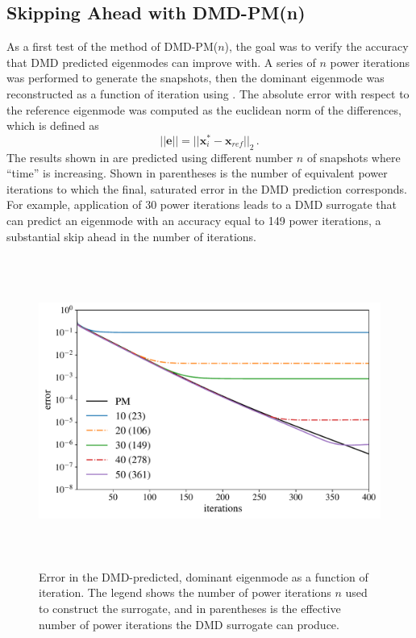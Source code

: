 \subsection{Skipping Ahead with DMD-PM(n)}
As a first test of the method of DMD-PM($n$), the goal was to verify the accuracy that DMD predicted eigenmodes can improve with.
A series of $n$ power iterations was performed to generate the snapshots, then the dominant eigenmode
was reconstructed as a function of iteration using .
The absolute error with respect to the reference eigenmode was computed as the euclidean norm of the differences, which is defined as 
\begin{equation}
 ||\mathbf{e}|| =  ||\mathbf{x}^{*}_i-\mathbf{x}_{ref}||_2   \, .
 \label{eq:flatten}
\end{equation}
The results shown in  are predicted using different number $n$ of snapshots where ``time'' is increasing.
Shown in parentheses is the number of equivalent power iterations to which the final, saturated error in the DMD prediction corresponds.
For example, application of 30 power iterations leads to a DMD surrogate that can predict an eigenmode with an accuracy equal to 149 power iterations, a substantial skip ahead in the number of iterations.

\begin{figure}[htb]%
    \centering
    \includegraphics[height=4.0in]{tex/figures/skipahead.pdf}
   \caption{Error in the DMD-predicted, dominant eigenmode as a function of iteration.  The legend shows the number of power iterations $n$ used to construct the surrogate, and in parentheses is the effective number of power iterations the DMD surrogate can produce.}
  \label{fig:skipahead}
\end{figure}

